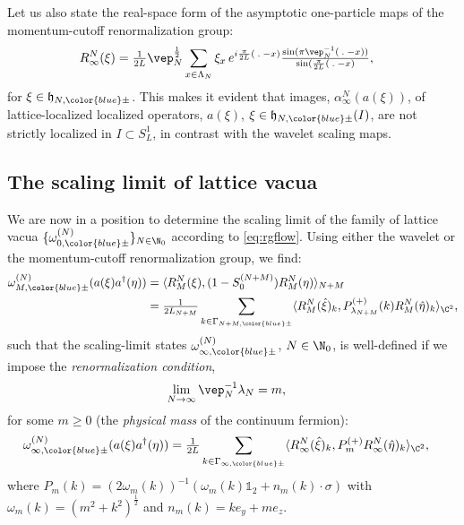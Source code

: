 \documentclass[a4paper, 11pt]{article}
\newcommand{\fh}{\mathfrak{h}}
\DeclareMathOperator{\1}{\mathds{1}}
\begin{document}
Let us also state the real-space form of the asymptotic one-particle maps of the momentum-cutoff renormalization group:
\begin{align}
\label{eq:momrg1preal}
R^{N}_{\infty}(\xi) & = \tfrac{1}{2L}\vep_{N}^{\frac{1}{2}}\sum_{x\in\Lambda_{N}}\xi_{x}\!\ e^{i\frac{\pi}{2L}(\!\ .\!\ -x)}\tfrac{\sin(\pi\vep_{N}^{-1}(\!\ .\!\ -x))}{\sin(\frac{\pi}{2L}(\!\ .\!\ -x)},
\end{align}
for $\xi\in\fh_{N,{\color{blue}\pm}}$. This makes it evident that images, $\alpha^{N}_{\infty}(a(\xi))$, of lattice-localized localized operators, $a(\xi)$, $\xi\in\fh_{N,{\color{blue}\pm}}(I)$, are not strictly localized in $I\subset S^{1}_{L}$, in contrast with the wavelet scaling maps.


\subsection{The scaling limit of lattice vacua}
\label{sec:latvaclim}
We are now in a position to determine the scaling limit of the family of lattice vacua $\{\omega^{(N)}_{0,{\color{blue}\pm}}\}_{N\in\N_{0}}$ according to \eqref{eq:rgflow}. Using either the wavelet or the momentum-cutoff renormalization group, we find:
\begin{align}
\label{eq:renvac}
\omega^{(N)}_{M,{\color{blue}\pm}}(a(\xi)a^{\dag}(\eta)) & = \langle R^{N}_{M}(\xi),(1-S^{(N+M)}_{0})R^{N}_{M}(\eta)\rangle_{N+M} \\ \nonumber
& = \tfrac{1}{2L_{N+M}}\sum_{k\in\Gamma_{N+M,{\color{blue}\pm}}}\langle R^{N}_{M}(\hat{\xi})_{k},P^{(+)}_{\lambda_{N+M}}(k)R^{N}_{M}(\hat{\eta})_{k}\rangle_{\C^{2}},
\end{align}
such that the scaling-limit states $\omega^{(N)}_{\infty,{\color{blue}\pm}}$, $N\in\N_{0}$, is well-defined if we impose the \textit{renormalization condition},
\begin{align}
\label{eq:rgcond}
\lim_{N\rightarrow\infty}\vep_{N}^{-1}\lambda_{N} & = m,
\end{align}
for some $m\geq0$ (the \textit{physical mass} of the continuum fermion):
\begin{align}
\label{eq:scalinglim}
\omega^{(N)}_{\infty,{\color{blue}\pm}}(a(\xi)a^{\dag}(\eta)) & = \tfrac{1}{2L}\sum_{k\in\Gamma_{\infty,{\color{blue}\pm}}}\langle R^{N}_{\infty}(\hat{\xi})_{k},P^{(+)}_{m} R^{N}_{\infty}(\hat{\eta})_{k}\rangle_{\C^{2}},
\end{align}
where $P_{m}(k) = (2\omega_{m}(k))^{-1}(\omega_{m}(k)\mathds{1}_{2}+n_{m}(k)\cdot\sigma)$ with $\omega_{m}(k)=(m^{2}+k^{2})^{\frac{1}{2}}$ and $n_{m}(k) = k e_{y} + m e_{z}$.
\end{document}
